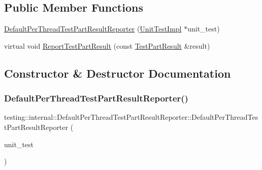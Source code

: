 \subsection*{Public Member Functions}
\begin{DoxyCompactItemize}
\item 
\hyperlink{classtesting_1_1internal_1_1_default_per_thread_test_part_result_reporter_a968a846e5a90d2ffea8b2ce2746099bd}{Default\+Per\+Thread\+Test\+Part\+Result\+Reporter} (\hyperlink{classtesting_1_1internal_1_1_unit_test_impl}{Unit\+Test\+Impl} $\ast$unit\+\_\+test)
\item 
virtual void \hyperlink{classtesting_1_1internal_1_1_default_per_thread_test_part_result_reporter_ac6dc08eadc4e5a2a64a91d0b6c6b3aad}{Report\+Test\+Part\+Result} (const \hyperlink{classtesting_1_1_test_part_result}{Test\+Part\+Result} \&result)
\end{DoxyCompactItemize}


\subsection{Constructor \& Destructor Documentation}
\mbox{\label{classtesting_1_1internal_1_1_default_per_thread_test_part_result_reporter_a968a846e5a90d2ffea8b2ce2746099bd}} 
\subsubsection{\texorpdfstring{Default\+Per\+Thread\+Test\+Part\+Result\+Reporter()}{DefaultPerThreadTestPartResultReporter()}}
{\footnotesize\ttfamily testing\+::internal\+::\+Default\+Per\+Thread\+Test\+Part\+Result\+Reporter\+::\+Default\+Per\+Thread\+Test\+Part\+Result\+Reporter (\begin{DoxyParamCaption}\item[{\hyperlink{classtesting_1_1internal_1_1_unit_test_impl}{Unit\+Test\+Impl} $\ast$}]{unit\+\_\+test }\end{DoxyParamCaption})\hspace{0.3cm}{\ttfamily [explicit]}}



